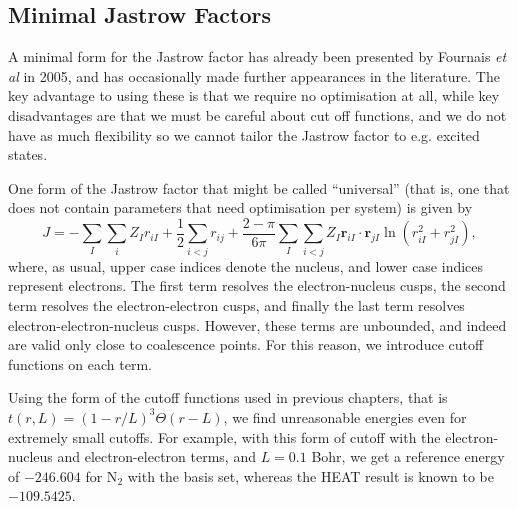 \subsection{Minimal Jastrow Factors}
\label{sec:universal-jastrow}
A minimal form for the Jastrow factor has already been presented by Fournais \emph{et al} in 2005,\supercite{fournaisSharp2005} and has occasionally made further appearances in the literature.\supercite{tewSecond2008,szenesStriking2024} The key advantage to using these is that we require no optimisation at all, while key disadvantages are that we must be careful about cut off functions, and we do not have as much flexibility so we cannot tailor the Jastrow factor to e.g. excited states.

One form of the Jastrow factor that might be called ``universal'' (that is, one that does not contain parameters that need optimisation per system)  is given by\supercite{fournaisSharp2005,fournaisNonIsotropic2007}
\begin{equation}
    \label{eq:fournais-full}
    J = -\sum_I\sum_i Z_Ir_{iI} + \frac 12\sum_{i<j}r_{ij} + \frac{2-\pi}{6\pi}\sum_I\sum_{i<j}Z_I\bm r_{iI}\cdot \bm r_{jI}\ln(r_{iI}^2+r_{jI}^2),
\end{equation}
where, as usual, upper case indices denote the nucleus, and lower case indices represent electrons. The first term resolves the electron-nucleus cusps, the second term resolves the electron-electron cusps, and finally the last term resolves electron-electron-nucleus cusps. However, these terms are unbounded, and indeed are valid only close to coalescence points. For this reason, we introduce cutoff functions on each term.

Using the form of the cutoff functions used in previous chapters, that is $t(r,L) = (1-r/L)^3\Theta(r-L)$, we find unreasonable energies even for extremely small cutoffs. For example, with this form of cutoff with the electron-nucleus and electron-electron terms, and $L=0.1$ Bohr, we get a reference energy of $-246.604$ for N$_2$ with the \avtz basis set, whereas the \gls{HEAT} result is known to be $-109.5425$.\supercite{fellerSurvey2008}

